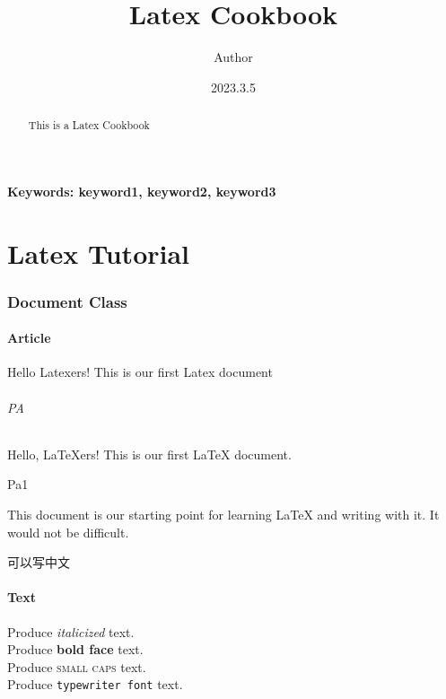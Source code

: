 \documentclass[a4paper, 12pt]{article}
\title{Latex Cookbook}
\author{Author}
\date{2023.3.5}
\begin{document}


\maketitle


\begin{abstract}
This is a Latex Cookbook
\end{abstract}
\textbf{Keywords: keyword1, keyword2, keyword3}  %



\part{Latex Tutorial}

\section{Document Class}

\subsection{Article}

Hello Latexers! This is our first Latex document

\paragraph{PA}
Hello, LaTeXers! This is our first LaTeX document.
\subparagraph{Pa1}
This document is our starting point for learning LaTeX and writing with it. It would not be difficult.

可以写中文


\subsection{Text}


Produce \textit{italicized} text. \\      %

Produce \textbf{bold face} text. \\       %

Produce \textsc{small caps} text. \\      %

Produce \texttt{typewriter font} text. \\ %
\end{document}
